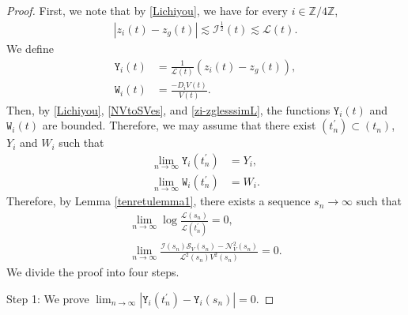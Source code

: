 \documentclass[10pt,a4paper]{amsart}
\numberwithin{equation}{section}
\begin{document}
\begin{proof}
First, we note that by \eqref{Lichiyou}, we have for every $i\in\mathbb{Z}/4\mathbb{Z}$,
\begin{align}\label{zi-zglesssimL}
\left|z_i(t)-z_g(t)\right|\lesssim \mathcal{I}^{\frac{1}{2}}(t)\lesssim \mathcal{L}(t).
\end{align}
We define
\begin{align}
\mathtt{Y}_i(t)&=\frac{1}{\mathcal{L}(t)}\left(z_i(t)-z_g(t)\right),
\\
\mathtt{W}_i(t)&=\frac{-D_iV(t)}{V(t)}.
\end{align}
Then, by \eqref{Lichiyou}, \eqref{NVtoSVes}, and \eqref{zi-zglesssimL}, the functions $\mathtt{Y}_i(t)$ and $\mathtt{W}_i(t)$ are bounded. Therefore, we may assume that there exist $(t_n^{\prime})\subset (t_n)$, $Y_i$ and $W_i$ such that 
\begin{align*}
\lim_{n\to\infty} \mathtt{Y}_i(t_n^{\prime})&=Y_i,
\\
\lim_{n\to\infty}\mathtt{W}_i(t_n^{\prime})&=W_i.
\end{align*}
Therefore, by Lemma \ref{tenretulemma1}, there exists a sequence $s_n\to\infty$ such that 
\begin{align*}
\lim_{n\to\infty}\log{\frac{\mathcal{L}(s_n)}{\mathcal{L}(t_n^{\prime})}}=0,
\\
\lim_{n\to\infty}\frac{\mathcal{I}(s_n)\mathcal{S}_V(s_n)-\mathcal{N}_V^2(s_n)}{\mathcal{L}^2(s_n)V^2(s_n)}=0.
\end{align*}
We divide the proof into four steps.

Step 1: We prove $\lim_{n\to\infty} \left|\mathtt{Y}_i(t_n^{\prime})-\mathtt{Y}_i(s_n)\right|=0$. 


\end{proof}
\end{document}
